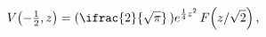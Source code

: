 \[\mathop{V\/}\nolimits\!\left(-\tfrac{1}{2},z\right)=(\ifrac{2}{\sqrt{\pi}}\,)e%
^{\frac{1}{4}z^{2}}\mathop{F\/}\nolimits\!\left(z/\sqrt{2}\right),\]